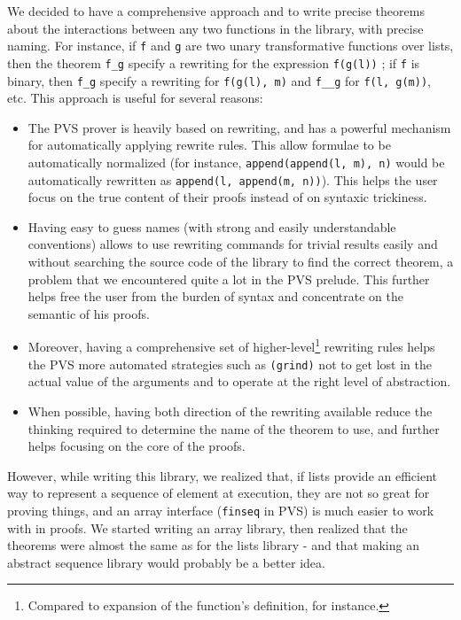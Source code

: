 \documentclass[utf8,a4paper]{article}
\begin{document}
We decided to have a comprehensive approach and to write precise
theorems about the interactions between any two functions in the
library, with precise naming. For instance, if \verb!f! and \verb!g!
are two unary transformative functions over lists, then the theorem
\verb!f_g! specify a rewriting for the expression \verb!f(g(l))! ; if
\verb!f! is binary, then \verb!f_g! specify a rewriting for
\verb!f(g(l), m)! and \verb!f__g! for \verb!f(l, g(m))!, etc. This
approach is useful for several reasons:
\begin{itemize}
\item The PVS prover is heavily based on rewriting, and has a powerful
  mechanism for automatically applying rewrite rules. This allow
  formulae to be automatically normalized (for instance,
  \verb!append(append(l, m), n)! would be automatically rewritten as
  \verb!append(l, append(m, n))!). This helps the user focus on the
  true content of their proofs instead of on syntaxic trickiness.
\item Having easy to guess names (with strong and easily
  understandable conventions) allows to use rewriting commands for
  trivial results easily and without searching the source code of the
  library to find the correct theorem, a problem that we encountered
  quite a lot in the PVS prelude. This further helps free the user
  from the burden of syntax and concentrate on the semantic of his
  proofs.
\item Moreover, having a comprehensive set of
  higher-level\footnote{Compared to expansion of the function's
    definition, for instance.} rewriting rules helps the PVS more
  automated strategies such as \verb!(grind)!  not to get lost in the
  actual value of the arguments and to operate at the right level of
  abstraction.
\item When possible, having both direction of the rewriting available
  reduce the thinking required to determine the name of the theorem to
  use, and further helps focusing on the core of the proofs.
\end{itemize}

However, while writing this library, we realized that, if lists
provide an efficient way to represent a sequence of element at
execution, they are not so great for proving things, and an array
interface (\verb!finseq! in PVS) is much easier to work with in
proofs. We started writing an array library, then realized that the
theorems were almost the same as for the lists library - and that
making an abstract sequence library would probably be a better idea.
\end{document}
